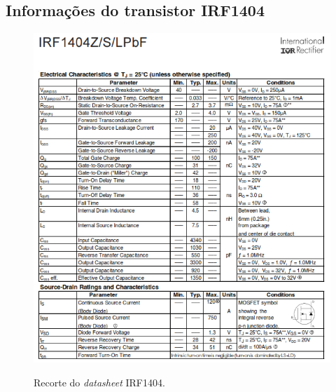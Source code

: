 \begin{anexosenv}
\chapter{Informações do transistor IRF1404}
\label{chap:anexoC}

\begin{figure}[H]
	\centering
	\caption{Recorte do \textit{datasheet} IRF1404.}
	\includegraphics[width=1\textwidth]{figuras/datasheet_irf.png}
	\label{fig:datasheet_irf}
\end{figure}



\end{anexosenv}